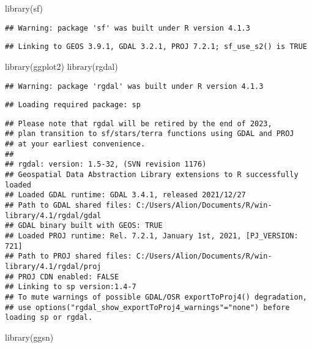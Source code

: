 \documentclass[
]{article}
\newenvironment{Shaded}{\begin{snugshade}}{\end{snugshade}}
\newcommand{\FunctionTok}[1]{\textcolor[rgb]{0.00,0.00,0.00}{#1}}
\newcommand{\NormalTok}[1]{#1}
\begin{document}
\begin{Shaded}
\begin{Highlighting}[]
\FunctionTok{library}\NormalTok{(sf)}
\end{Highlighting}
\end{Shaded}

\begin{verbatim}
## Warning: package 'sf' was built under R version 4.1.3
\end{verbatim}

\begin{verbatim}
## Linking to GEOS 3.9.1, GDAL 3.2.1, PROJ 7.2.1; sf_use_s2() is TRUE
\end{verbatim}

\begin{Shaded}
\begin{Highlighting}[]
\FunctionTok{library}\NormalTok{(ggplot2)}
\FunctionTok{library}\NormalTok{(rgdal)}
\end{Highlighting}
\end{Shaded}

\begin{verbatim}
## Warning: package 'rgdal' was built under R version 4.1.3
\end{verbatim}

\begin{verbatim}
## Loading required package: sp
\end{verbatim}

\begin{verbatim}
## Please note that rgdal will be retired by the end of 2023,
## plan transition to sf/stars/terra functions using GDAL and PROJ
## at your earliest convenience.
## 
## rgdal: version: 1.5-32, (SVN revision 1176)
## Geospatial Data Abstraction Library extensions to R successfully loaded
## Loaded GDAL runtime: GDAL 3.4.1, released 2021/12/27
## Path to GDAL shared files: C:/Users/Alion/Documents/R/win-library/4.1/rgdal/gdal
## GDAL binary built with GEOS: TRUE 
## Loaded PROJ runtime: Rel. 7.2.1, January 1st, 2021, [PJ_VERSION: 721]
## Path to PROJ shared files: C:/Users/Alion/Documents/R/win-library/4.1/rgdal/proj
## PROJ CDN enabled: FALSE
## Linking to sp version:1.4-7
## To mute warnings of possible GDAL/OSR exportToProj4() degradation,
## use options("rgdal_show_exportToProj4_warnings"="none") before loading sp or rgdal.
\end{verbatim}

\begin{Shaded}
\begin{Highlighting}[]
\FunctionTok{library}\NormalTok{(ggsn)}
\end{Highlighting}
\end{Shaded}
\end{document}
